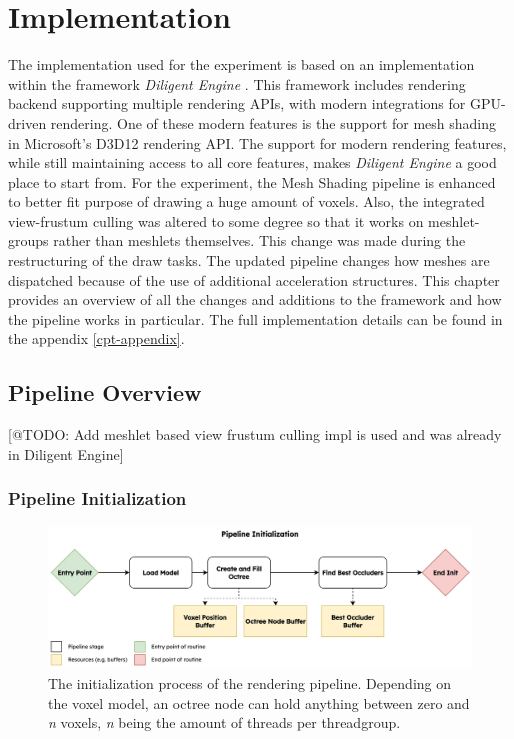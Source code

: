 \chapter{Implementation} \label{cpt-implementation}

The implementation used for the experiment is based on an implementation within the framework \emph{Diligent Engine} 
\cite{DiligentGraphicsGitHub, DiligentGraphics}. This framework includes rendering backend supporting 
multiple rendering \ac{API}s, with modern integrations for \ac{GPU}-driven rendering. One of these modern 
features is the support for mesh shading in Microsoft's D3D12 rendering \ac{API}. The support for modern 
rendering features, while still maintaining access to all core features, makes \emph{Diligent Engine} a good 
place to start from. For the experiment, the Mesh Shading pipeline is enhanced to better fit purpose of drawing 
a huge amount of voxels. Also, the integrated view-frustum culling was altered to some degree so that it works on 
meshlet-groups rather than meshlets themselves. This change was made during the restructuring of the draw tasks. 
The updated pipeline changes how meshes are dispatched because of the use of additional acceleration structures. 
This chapter provides an overview of all the changes and additions to the framework and how the pipeline works 
in particular. The full implementation details can be found in the appendix \ref{cpt-appendix}.

\section{Pipeline Overview} \label{sec-piepline-initialization}

[@TODO: Add meshlet based view frustum culling impl is used and was already in Diligent Engine]

\subsection*{Pipeline Initialization} \label{subsec-piepline-initialization}

\begin{figure}[h]
    \centering
    \includegraphics[width=\linewidth]{images/graphics/pipeline-initialization.jpg}
    \caption{The initialization process of the rendering pipeline. Depending on the voxel model, an octree node 
    can hold anything between zero and \emph{n} voxels, \emph{n} being the amount of threads per threadgroup.}
    \label{fig:pipeline-initialization}
\end{figure}


